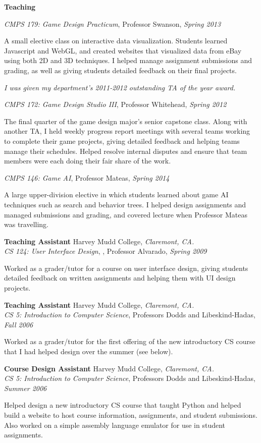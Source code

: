 \documentclass[11pt]{article}
\newenvironment{sct}[1]{%
  \vspace{8pt plus 2pt minus 4pt}\textbf{\Large #1} \hrulefill\vspace{6pt}
  \begin{adjustwidth}{6pt}{0pt}
}{%
  \end{adjustwidth}
}
\newcommand{\indented}[1]{\hspace*{\fill}\parbox{\textwidth-22pt}{#1}}
\newcommand{\teachingexperience}[7]{%
  \textbf{#1} #2, \textit{#3.} \\
  \textit{#4}, #5, \textit{#6} \\
  \indented{#7}
  \vspace{7pt plus 2pt minus 2pt}
}
\begin{document}
\begin{sct}{Teaching}
{\textit{CMPS 179: Game Design Practicum}, Professor Swanson, \textit{Spring 2013} \\
\indented{
A small elective class on interactive data visualization. Students learned
Javascript and WebGL, and created websites that visualized data from eBay using
both 2D and 3D techniques. I helped manage assignment submissions and grading,
as well as giving students detailed feedback on their final projects.
}
\vspace{6pt}

\textit{I was given my department's 2011-2012 outstanding TA of the year award.}
\vspace{6pt}

\textit{CMPS 172: Game Design Studio III}, Professor Whitehead, \textit{Spring 2012} \\
\indented{
The final quarter of the game design major's senior capstone class. Along with
another TA, I held weekly progress report meetings with several teams working
to complete their game projects, giving detailed feedback and helping teams
manage their schedules. Helped resolve internal disputes and ensure that team
members were each doing their fair share of the work.
}
\vspace{6pt}

\textit{CMPS 146: Game AI}, Professor Mateas, \textit{Spring 2014} \\
\indented{
A large upper-division elective in which students learned about game AI
techniques such as search and behavior trees. I helped design assignments and
managed submissions and grading, and covered lecture when Professor Mateas was
travelling.
}
}

\teachingexperience{Teaching Assistant}{Harvey Mudd College}{Claremont, CA}%
{CS 124: User Interface Design}{, Professor Alvarado}{Spring 2009}%
{Worked as a grader/tutor for a course on user interface design, giving students
detailed feedback on written assignments and helping them with UI design
projects.}

\teachingexperience{Teaching Assistant}{Harvey Mudd College}{Claremont, CA}%
{CS 5: Introduction to Computer Science}{Professors Dodds and Libeskind-Hadas}{Fall 2006}%
{Worked as a grader/tutor for the first offering of the new introductory CS
course that I had helped design over the summer (see below).}

\teachingexperience{Course Design Assistant}{Harvey Mudd College}{Claremont, CA}%
{CS 5: Introduction to Computer Science}{Professors Dodds and Libeskind-Hadas}{Summer 2006}%
{Helped design a new introductory CS course that taught Python and helped build
a website to host course information, assignments, and student submissions.
Also worked on a simple assembly language emulator for use in student
assignments.}

\end{sct}
\end{document}
